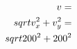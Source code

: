 \documentclass[preview]{standalone}
\begin{document}
\begin{align*}
\special{dvisvgm:raw <g id='unique000'>}v = \\sqrt{v_x^2 + v_y^2} = \\sqrt{200^2 + 200^2}\special{dvisvgm:raw </g>}
\end{align*}
\end{document}

